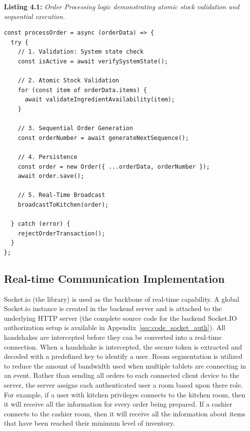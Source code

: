 \vspace{1em}
\noindent\textbf{Listing 4.1:} \textit{Order Processing logic demonstrating atomic stock validation and sequential execution.} \\
\vspace{-0.5em}
\begin{verbatim}
const processOrder = async (orderData) => {
  try {
    // 1. Validation: System state check
    const isActive = await verifySystemState();
    
    // 2. Atomic Stock Validation
    for (const item of orderData.items) {
      await validateIngredientAvailability(item);
    }

    // 3. Sequential Order Generation
    const orderNumber = await generateNextSequence();

    // 4. Persistence
    const order = new Order({ ...orderData, orderNumber });
    await order.save();

    // 5. Real-Time Broadcast
    broadcastToKitchen(order);
    
  } catch (error) {
    rejectOrderTransaction();
  }
};
\end{verbatim}
\vspace{1em}

\subsection{Real-time Communication Implementation}

Socket.io (the library) is used as the backbone of real-time capability. 
A global Socket.io instance is created in the backend server and is attached to the underlying HTTP server (the complete source code for the backend Socket.IO authorization setup is available in Appendix~\ref{sec:code_socket_auth}). 
All handshakes are intercepted before they can be converted into a real-time connection. 
When a handshake is intercepted, the secure token is extracted and decoded with a predefined key to identify a user. 
Room segmentation is utilized to reduce the amount of bandwidth used when multiple tablets are connecting in an event. 
Rather than sending all orders to each connected client device to the server, the server assigns each authenticated user a room based upon there role. 
For example, if a user with kitchen privileges connects to the kitchen room, then it will receive all the information for every order being prepared. If a cashier connects to the cashier room, then it will receive all the information about items that have been reached their minimum level of inventory.

